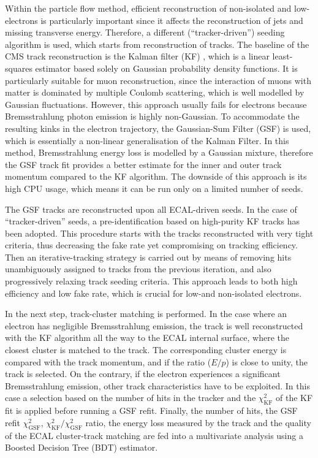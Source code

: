 Within the particle flow method, efficient reconstruction of non-isolated and low-\pt electrons is particularly
important since it affects the reconstruction of jets and missing transverse energy. Therefore, a different
(``tracker-driven'') seeding algorithm is used, which starts from reconstruction of tracks. The baseline of the CMS
track reconstruction is the Kalman filter (KF) \autocite{KF}, which is a linear least-squares estimator based solely on
Gaussian probability density functions. It is particularly suitable for muon reconstruction, since the interaction of
muons with matter is dominated by multiple Coulomb scattering, which is well modelled by Gaussian fluctuations. However,
this approach usually fails for electrons because Bremsstrahlung photon emission is highly non-Gaussian. To accommodate
the resulting kinks in the electron trajectory, the Gaussian-Sum Filter (GSF) \autocite{GSF} is used, which is
essentially a non-linear generalisation of the Kalman Filter. In this method, Bremsstrahlung energy loss is modelled by
a Gaussian mixture, therefore the GSF track fit provides a better estimate for the inner and outer track momentum
compared to the KF algorithm. The downside of this approach is its high CPU usage, which means it can be run only on a
limited number of seeds.

The GSF tracks are reconstructed upon all ECAL-driven seeds. In the case of ``tracker-driven'' seeds, a
pre-identification based on high-purity KF tracks has been adopted. This procedure starts with the tracks reconstructed
with very tight criteria, thus decreasing the fake rate yet compromising on tracking efficiency. Then an
iterative-tracking strategy is carried out by means of removing hits unambiguously assigned to tracks from the previous
iteration, and also progressively relaxing track seeding criteria. This approach leads to both high efficiency and low
fake rate, which is crucial for low-\pt and non-isolated electrons.

In the next step, track-cluster matching is performed. In the case where an electron has negligible Bremsstrahlung
emission, the track is well reconstructed with the KF algorithm all the way to the ECAL internal surface, where the
closest cluster is matched to the track. The corresponding cluster energy is compared with the track momentum, and if
the ratio ($E/p$) is close to unity, the track is selected. On the contrary, if the electron experiences a significant
Bremsstrahlung emission, other track characteristics have to be exploited. In this case a selection based on the number
of hits in the tracker and the $\chi^2_\textrm{KF}$ of the KF fit is applied before running a GSF refit. Finally, the
number of hits, the GSF refit $\chi^2_\textrm{GSF}$, $\chi^2_\textrm{KF}/\chi^2_\textrm{GSF}$ ratio, the energy loss
measured by the track and the quality of the ECAL cluster-track matching are fed into a multivariate analysis using a
Boosted Decision Tree (BDT) estimator.

